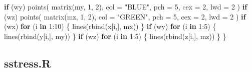 \documentclass[
  12pt,
]{book}
\newenvironment{Shaded}{\begin{snugshade}}{\end{snugshade}}
\newcommand{\AttributeTok}[1]{\textcolor[rgb]{0.77,0.63,0.00}{#1}}
\newcommand{\ControlFlowTok}[1]{\textcolor[rgb]{0.13,0.29,0.53}{\textbf{#1}}}
\newcommand{\DecValTok}[1]{\textcolor[rgb]{0.00,0.00,0.81}{#1}}
\newcommand{\FunctionTok}[1]{\textcolor[rgb]{0.00,0.00,0.00}{#1}}
\newcommand{\NormalTok}[1]{#1}
\newcommand{\SpecialCharTok}[1]{\textcolor[rgb]{0.00,0.00,0.00}{#1}}
\newcommand{\StringTok}[1]{\textcolor[rgb]{0.31,0.60,0.02}{#1}}
\theoremstyle{definition}
\theoremstyle{definition}
\theoremstyle{definition}
\theoremstyle{definition}
\theoremstyle{remark}
\begin{document}
\begin{Shaded}
\begin{Highlighting}[]
  \ControlFlowTok{if}\NormalTok{ (wy)}
    \FunctionTok{points}\NormalTok{(}
      \FunctionTok{matrix}\NormalTok{(my, }\DecValTok{1}\NormalTok{, }\DecValTok{2}\NormalTok{),}
      \AttributeTok{col =} \StringTok{"BLUE"}\NormalTok{,}
      \AttributeTok{pch =} \DecValTok{5}\NormalTok{,}
      \AttributeTok{cex =} \DecValTok{2}\NormalTok{,}
      \AttributeTok{lwd =} \DecValTok{2}
\NormalTok{    )}
  \ControlFlowTok{if}\NormalTok{ (wz)}
    \FunctionTok{points}\NormalTok{(}
      \FunctionTok{matrix}\NormalTok{(mz, }\DecValTok{1}\NormalTok{, }\DecValTok{2}\NormalTok{),}
      \AttributeTok{col =} \StringTok{"GREEN"}\NormalTok{,}
      \AttributeTok{pch =} \DecValTok{5}\NormalTok{,}
      \AttributeTok{cex =} \DecValTok{2}\NormalTok{,}
      \AttributeTok{lwd =} \DecValTok{2}
\NormalTok{    )}
  \ControlFlowTok{if}\NormalTok{ (wx)}
    \ControlFlowTok{for}\NormalTok{ (i }\ControlFlowTok{in} \DecValTok{1}\SpecialCharTok{:}\DecValTok{10}\NormalTok{) \{}
      \FunctionTok{lines}\NormalTok{(}\FunctionTok{rbind}\NormalTok{(x[i,], mx))}
\NormalTok{    \}}
  \ControlFlowTok{if}\NormalTok{ (wy)}
    \ControlFlowTok{for}\NormalTok{ (i }\ControlFlowTok{in} \DecValTok{1}\SpecialCharTok{:}\DecValTok{5}\NormalTok{) \{}
      \FunctionTok{lines}\NormalTok{(}\FunctionTok{rbind}\NormalTok{(y[i,], my))}
\NormalTok{    \}}
  \ControlFlowTok{if}\NormalTok{ (wz)}
    \ControlFlowTok{for}\NormalTok{ (i }\ControlFlowTok{in} \DecValTok{1}\SpecialCharTok{:}\DecValTok{5}\NormalTok{) \{}
      \FunctionTok{lines}\NormalTok{(}\FunctionTok{rbind}\NormalTok{(z[i,], mz))}
\NormalTok{    \}}
\NormalTok{\}}
\end{Highlighting}
\end{Shaded}

\hypertarget{apcodesstress}{%
\subsection{sstress.R}\label{apcodesstress}}
\end{document}
